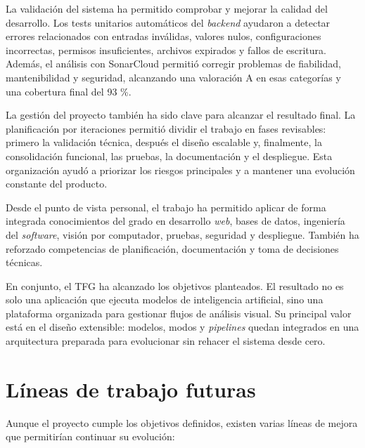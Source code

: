 La validación del sistema ha permitido comprobar y mejorar la calidad del desarrollo. Los tests unitarios automáticos del \textit{backend} ayudaron a detectar errores relacionados con entradas inválidas, valores nulos, configuraciones incorrectas, permisos insuficientes, archivos expirados y fallos de escritura. Además, el análisis con SonarCloud permitió corregir problemas de fiabilidad, mantenibilidad y seguridad, alcanzando una valoración A en esas categorías y una cobertura final del 93 \%.

La gestión del proyecto también ha sido clave para alcanzar el resultado final. La planificación por iteraciones permitió dividir el trabajo en fases revisables: primero la validación técnica, después el diseño escalable y, finalmente, la consolidación funcional, las pruebas, la documentación y el despliegue. Esta organización ayudó a priorizar los riesgos principales y a mantener una evolución constante del producto.

Desde el punto de vista personal, el trabajo ha permitido aplicar de forma integrada conocimientos del grado en desarrollo \textit{web}, bases de datos, ingeniería del \textit{software}, visión por computador, pruebas, seguridad y despliegue. También ha reforzado competencias de planificación, documentación y toma de decisiones técnicas.

En conjunto, el TFG ha alcanzado los objetivos planteados. El resultado no es solo una aplicación que ejecuta modelos de inteligencia artificial, sino una plataforma organizada para gestionar flujos de análisis visual. Su principal valor está en el diseño extensible: modelos, modos y \textit{pipelines} quedan integrados en una arquitectura preparada para evolucionar sin rehacer el sistema desde cero.


\section{Líneas de trabajo futuras}

Aunque el proyecto cumple los objetivos definidos, existen varias líneas de mejora que permitirían continuar su evolución:

